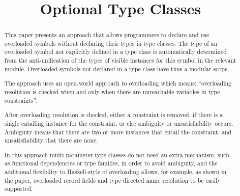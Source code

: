 \documentclass[review]{elsarticle}
\begin{document}
\begin{frontmatter}

\title{Optional Type Classes}

\begin{abstract}

This paper presents an approach that allows programmers to declare and
use overloaded symbols without declaring their types in type
classes. The type of an overloaded symbol not explicitly defined in a
type class is automatically determined from the anti-unification of
the types of visible instances for this symbol in the relevant module.
Overloaded symbols not declared in a type class have thus a modular
scope.


The approach uses an open-world approach to overloading which means:
``overloading resolution is checked when and only when there are
unreachable variables in type constraints''.

After overloading resolution is checked, either a constraint is
removed, if there is a single entailing instance for the constraint,
or else ambiguity or unsatisfiability occurs. Ambiguity means that
there are two or more instances that entail the constraint, and
unsatisfiability that there are none.


In this approach multi-parameter type classes do not need an extra
mechanism, such as functional dependencies or type families, in order
to avoid ambiguity, and the additional flexibility to Haskell-style of
overloading allows, for example, as shown in the paper, overloaded
record fields and type directed name resolution to be easily
supported.




\end{abstract}
\end{frontmatter}
\end{document}
